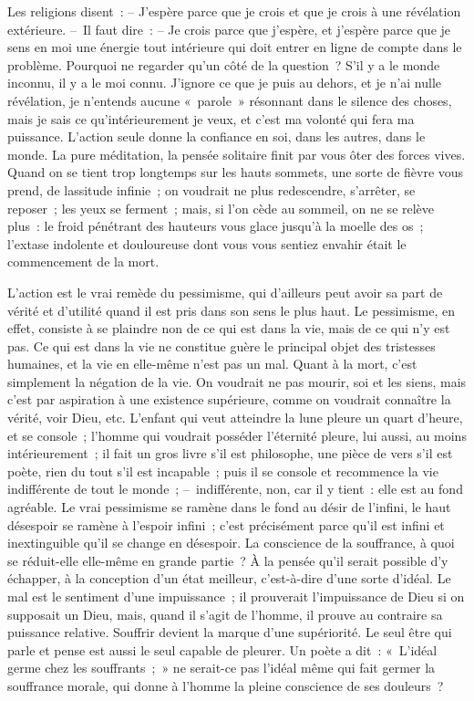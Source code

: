 \documentclass[french,twoside]{book} %
\begin{document}
Les religions disent : – J’espère parce que je crois et que je crois à une révélation extérieure. – Il faut dire : – Je crois parce que j’espère, et j’espère parce que je sens en moi une énergie tout intérieure qui doit entrer en ligne de compte dans le problème. Pourquoi ne regarder qu’un côté de la question ? S’il y a le monde inconnu, il y a le moi connu. J’ignore ce que je puis au dehors, et je n’ai nulle révélation, je n’entends aucune « parole » résonnant dans le silence des choses, mais je sais ce qu’intérieurement je veux, et c’est ma volonté qui fera ma puissance. L’action seule donne la confiance en soi, dans les autres, dans le monde. La pure méditation, la pensée solitaire finit par vous ôter des forces vives. Quand on se tient trop longtemps sur les hauts sommets, une sorte de fièvre vous prend, de lassitude infinie ; on voudrait ne plus redescendre, s’arrêter, se reposer ; les yeux se ferment ; mais, si l’on cède au sommeil, on ne se relève plus : le froid pénétrant des hauteurs vous glace jusqu’à la moelle des os ; l’extase indolente et douloureuse dont vous vous sentiez envahir était le commencement de la mort.\par
L’action est le vrai remède du pessimisme, qui d’ailleurs peut avoir sa part de vérité et d’utilité quand il est pris dans son sens le plus haut. Le pessimisme, en effet, consiste à se plaindre non de ce qui est dans la vie, mais de ce qui n’y est pas. Ce qui est dans la vie ne constitue guère le principal objet des tristesses humaines, et la vie en elle-même n’est pas un mal. Quant à la mort, c’est simplement la négation de la vie. On voudrait ne pas mourir, soi et les siens, mais c’est par aspiration à une existence supérieure, comme on voudrait connaître la vérité, voir Dieu, etc. L’enfant qui veut atteindre la lune pleure un quart d’heure, et se console ; l’homme qui voudrait posséder l’éternité pleure, lui aussi, au moins intérieurement ; il fait un gros livre s’il est philosophe, une pièce de vers s’il est poète, rien du tout s’il est incapable ; puis il se console et recommence la vie indifférente de tout le monde ; – indifférente, non, car il y tient : elle est au fond agréable. Le vrai pessimisme se ramène dans le fond au désir de l’infini, le haut désespoir se ramène à l’espoir infini ; c’est précisément parce qu’il est infini et inextinguible qu’il se change en désespoir. La conscience de la souffrance, à quoi se réduit-elle elle-même en grande partie ? À la pensée qu’il serait possible d’y échapper, à la conception d’un état meilleur, c’est-à-dire d’une sorte d’idéal. Le mal est le sentiment d’une impuissance ; il prouverait l’impuissance de Dieu si on supposait un Dieu, mais, quand il s’agit de l’homme, il prouve au contraire sa puissance relative. Souffrir devient la marque d’une supériorité. Le seul être qui parle et pense est aussi le seul capable de pleurer. Un poète a dit : « L’idéal germe chez les souffrants ; » ne serait-ce pas l’idéal même qui fait germer la souffrance morale, qui donne à l’homme la pleine conscience de ses douleurs ?\par
\end{document}
